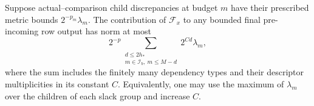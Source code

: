 \begin{lemma}\label{lem:fp-escape}
Suppose actual--comparison child discrepancies at budget $m$ have their
prescribed metric bounds $2^{-p_m}\lambda_m$.  The contribution of
$\mathcal F_x$ to any bounded final pre-incoming row output has norm at
most
\begin{equation}
 2^{-p}\sum_{\substack{d\le2h_*\\m\in\mathcal I_b,\ m\le M-d}}
                 2^{C d}\lambda_m,
 \label{eq:fp-escape-charge}
\end{equation}
where the sum includes the finitely many dependency types and their
descriptor multiplicities in its constant $C$.  Equivalently, one may
use the maximum of $\lambda_m$ over the children of each slack group
and increase $C$.
\end{lemma}

